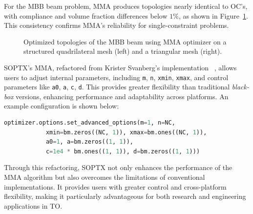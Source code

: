 \documentclass[mathpazo]{cicp}
\begin{document}
For the MBB beam problem, MMA produces topologies nearly identical to OC’s, with compliance and volume fraction differences below $1\%$, as shown in Figure~\ref{fig:mbb_mma_all}. This consistency confirms MMA’s reliability for single-constraint problems.
\vspace{-2ex} %
\begin{figure}[htp]
	\centering
	\caption{Optimized topologies of the MBB beam using MMA optimizer on a structured quadrilateral mesh (left) and a triangular mesh (right).}
	\label{fig:mbb_mma_all}
\end{figure}
\vspace{-2ex} %

SOPTX’s MMA, refactored from Krister Svanberg’s implementation ~\cite{Svanberg2007MmaAG}, allows users to adjust internal parameters, including \texttt{m}, \texttt{n}, \texttt{xmin}, \texttt{xmax}, and control parameters like \texttt{a0}, \texttt{a}, \texttt{c}, \texttt{d}. This provides greater flexibility than traditional \textit{black-box} versions, enhancing performance and adaptability across platforms. An example configuration is shown below:
\vspace{-0.5ex} %
\begin{lstlisting}[language=python]
optimizer.options.set_advanced_options(m=1, n=NC,
			xmin=bm.zeros((NC, 1)), xmax=bm.ones((NC, 1)),
			a0=1, a=bm.zeros((1, 1)),
			c=1e4 * bm.ones((1, 1)), d=bm.zeros((1, 1)))
\end{lstlisting}
\vspace{-0.5ex} %

Through this refactoring, SOPTX not only enhances the performance of the MMA algorithm but also overcomes the limitations of conventional implementations. It provides users with greater control and cross-platform flexibility, making it particularly advantageous for both research and engineering applications in TO.
\end{document}
